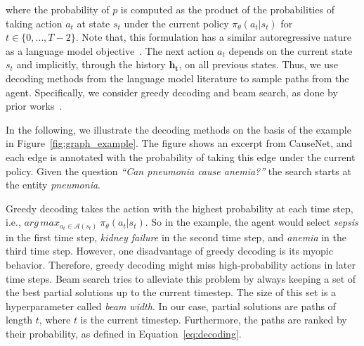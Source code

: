  where the probability of $p$ is computed as the product of the probabilities of taking action $a_t$ at state $s_t$ under the current policy $\pi_{\theta}(a_t | s_t)$ for $t \in \{0,\dots,T-2\}$.
 Note that, this formulation has a similar autoregressive nature as a language model objective~\cite{Bengio2003LM}. 
The next action $a_t$ depends on the current state $s_t$ and implicitly, through the history $\mathbf{h_t}$, on all previous states.
 Thus, we use decoding methods from
  the language model literature to sample paths from the agent. Specifically,
we consider greedy decoding and beam search, as done by prior works~\cite{Das2018Minerva, Qiu2020Stepwise}.


In the following, we illustrate the decoding methods on the basis of the example 
in Figure~\ref{fig:graph_example}. The figure shows an excerpt from CauseNet, and each edge 
is annotated with the probability of taking this edge under the current policy.
Given the question \textit{``Can pneumonia cause anemia?''} the search starts at the 
entity \textit{pneumonia}.

Greedy decoding takes the action with the highest probability at each time step, i.e.,
$arg\,max_{a_t \in \mathcal{A}(s_t)} \ \pi_{\theta}(a_t | s_t)$. So in the example,
 the agent would select \textit{sepsis} in the first time step, \textit{kidney failure} in
 the second time step, and \textit{anemia} in the third time step. 
 However, one disadvantage of greedy decoding is its myopic
  behavior. Therefore, greedy decoding might miss high-probability actions in later
  time steps. Beam search tries to alleviate this problem by always keeping a set of the 
  best partial solutions up to the current timestep. The size of this set is a hyperparameter called \textit{beam width}.
  In our case, partial solutions are paths of length $t$, where $t$ is the 
  current timestep. Furthermore, the paths are ranked by their probability, as defined in
  Equation~\ref{eq:decoding}.
   
